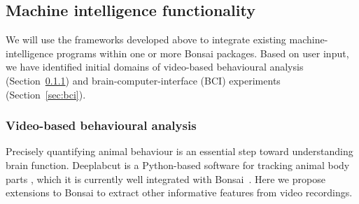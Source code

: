 


%         


\subsection{Machine intelligence functionality}
\label{sec:functionality}

We will use the frameworks developed above to integrate existing machine-intelligence programs within one or more Bonsai packages.  Based on user input, we have identified initial domains of video-based behavioural analysis (Section~\ref{sec:videoBasedBehavioralAnalysis}) and
brain-computer-interface (BCI) experiments (Section~\ref{sec:bci}). 

\subsubsection{Video-based behavioural analysis}
\label{sec:videoBasedBehavioralAnalysis}

Precisely quantifying animal behaviour is an essential step toward understanding
brain function.  Deeplabcut is a Python-based software for tracking animal body
parts \citep{mathisEtAl18}, which it is currently well integrated with
Bonsai~\citep{kaneEtAl20}. Here we propose extensions to Bonsai to extract
other informative features from video recordings.

